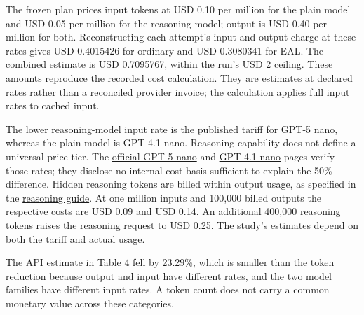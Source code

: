 \documentclass[preprint,11pt]{elsarticle}
\begin{document}
The frozen plan prices input tokens at USD 0.10 per million for the
plain model and USD 0.05 per million for the reasoning model; output is
USD 0.40 per million for both. Reconstructing each attempt's input and
output charge at these rates gives USD 0.4015426 for ordinary and USD
0.3080341 for EAL. The combined estimate is USD 0.7095767, within the
run's USD 2 ceiling. These amounts reproduce the recorded cost
calculation. They are estimates at declared rates rather than a
reconciled provider invoice; the calculation applies full input rates to
cached input.

The lower reasoning-model input rate is the published tariff for GPT-5
nano, whereas the plain model is GPT-4.1 nano. Reasoning capability does
not define a universal price tier. The
\href{https://developers.openai.com/api/docs/models/gpt-5-nano}{official
GPT-5 nano} and
\href{https://developers.openai.com/api/docs/models/gpt-4.1-nano}{GPT-4.1
nano} pages verify those rates; they disclose no internal cost basis
sufficient to explain the 50\% difference. Hidden reasoning tokens are
billed within output usage, as specified in the
\href{https://developers.openai.com/api/docs/guides/reasoning}{reasoning
guide}. At one million inputs and 100,000 billed outputs the respective
costs are USD 0.09 and USD 0.14. An additional 400,000 reasoning tokens
raises the reasoning request to USD 0.25. The study's estimates depend
on both the tariff and actual usage.

The API estimate in Table 4 fell by 23.29\%, which is smaller than the
token reduction because output and input have different rates, and the
two model families have different input rates. A token count does not
carry a common monetary value across these categories.
\end{document}
